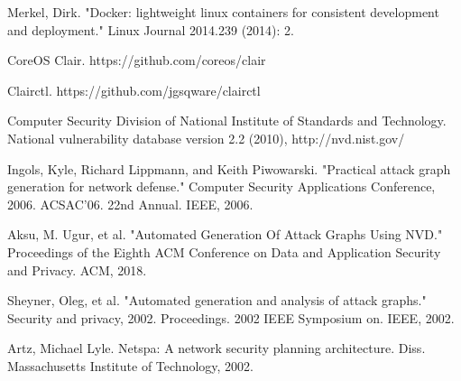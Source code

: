 \documentclass[letterpaper, 10 pt, conference]{ieeeconf}  %
\begin{document}


\begin{thebibliography}{99}

 Merkel, Dirk. "Docker: lightweight linux containers for consistent development and deployment." Linux Journal 2014.239 (2014): 2.

  CoreOS Clair. https://github.com/coreos/clair

  Clairctl. https://github.com/jgsqware/clairctl

  Computer Security Division of National Institute of Standards and Technology.
National vulnerability database version 2.2 (2010),
http://nvd.nist.gov/

  Ingols, Kyle, Richard Lippmann, and Keith Piwowarski. "Practical attack graph generation for network defense." Computer Security Applications Conference, 2006. ACSAC'06. 22nd Annual. IEEE, 2006.

  Aksu, M. Ugur, et al. "Automated Generation Of Attack Graphs Using NVD." Proceedings of the Eighth ACM Conference on Data and Application Security and Privacy. ACM, 2018.

  Sheyner, Oleg, et al. "Automated generation and analysis of attack graphs." Security and privacy, 2002. Proceedings. 2002 IEEE Symposium on. IEEE, 2002.

  Artz, Michael Lyle. Netspa: A network security planning architecture. Diss. Massachusetts Institute of Technology, 2002.
\end{thebibliography}
\end{document}
